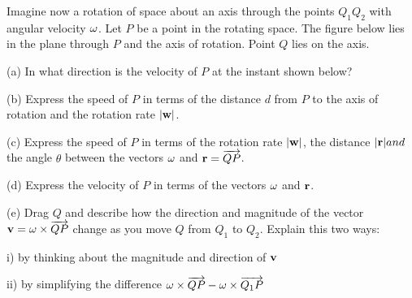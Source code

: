 \documentclass{ximera}
\begin{document}
\begin{question}  \label{Qdstjigvgf:Cross}
Imagine now a rotation of space about an axis through the points $Q_1Q_2$ with angular velocity ${\bf \omega}$. Let $P$ be a point in the rotating space. The figure below lies in the plane through $P$ and the axis of rotation. Point $Q$ lies on the axis.

(a) In what direction is the velocity of $P$ at the instant shown below?

(b) Express the speed of $P$ in terms of the distance $d$ from $P$ to the axis of rotation and the rotation rate $|{\bf w}|$.

(c) Express the speed of $P$ in terms of the rotation rate $|{\bf w}|$, the distance $|{\bf r}| and $the angle $\theta$ between the vectors ${\bf \omega}$ and ${\bf r} = \overrightarrow{QP}$.

(d) Express the velocity of $P$ in terms of the vectors ${\bf \omega}$ and ${\bf r}$.


(e) Drag $Q$ and describe how the direction and magnitude of the vector ${\bf v} = {\bf \omega}\times {\overrightarrow{QP}}$ change as you move $Q$ from $Q_1$ to $Q_2$. Explain this two ways:

i) by thinking about the magnitude and direction of ${\bf v}$

ii) by simplifying the difference ${\bf \omega}\times {\overrightarrow{QP}} - {\bf \omega}\times {\overrightarrow{Q_1P}}$


 
\begin{onlineOnly}
    \begin{center}
\end{center}
\end{onlineOnly}

\end{question}
\end{document}

